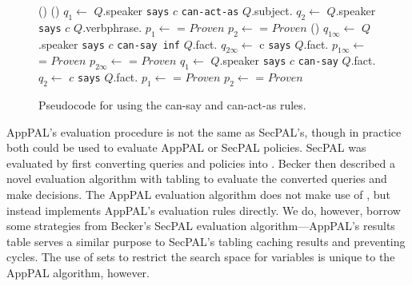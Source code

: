 \documentclass[thesis.tex]{subfiles}
\begin{document}
\begin{figure}\footnotesize\sffamily\centering
  \begin{algorithm}[H]
    \Fn(){}{
    }
   \; 
    \Fn(){}{
      $q_1 \gets$ $Q$.speaker \texttt{says} $c$ \texttt{can-act-as} $Q$.subject.\; 
      $q_2 \gets$ $Q$.speaker \texttt{says} $c$ $Q$.verbphrase.\;
      $p_1 \gets$  = $Proven$\;
      $p_2 \gets$  = $Proven$\;
    }
   \; 
    \Fn(){}{
      $q_{1\infty} \gets$ $Q$.speaker \texttt{says} $c$ \texttt{can-say inf} $Q$.fact.\; 
      $q_{2\infty} \gets$ c \texttt{says} $Q$.fact.\;
      $p_{1\infty} \gets$  = $Proven$\;
      $p_{2\infty} \gets$  = $Proven$\;
      $q_1 \gets$ $Q$.speaker \texttt{says} $c$ \texttt{can-say} $Q$.fact.\; 
      $q_2 \gets$ $c$ \texttt{says} $Q$.fact.\;
      $p_1 \gets$  = $Proven$\;
      $p_2 \gets$  = $Proven$\;
    }
  \end{algorithm}
  \caption{Pseudocode for using the can-say and can-act-as rules.}
  \label{alg:eval2}
\end{figure}

AppPAL's evaluation procedure is not the same as SecPAL's, though in practice
both could be used to evaluate AppPAL or SecPAL policies.  SecPAL was evaluated
by first converting queries and policies into \datalogc{}.  Becker then
described a novel \datalogc{} evaluation algorithm with tabling to evaluate the
converted queries and make decisions. The AppPAL evaluation algorithm does not
make use of  \datalogc{}, but instead implements AppPAL's
evaluation rules directly.  We do, however, borrow some strategies from
Becker's SecPAL evaluation algorithm---AppPAL's results table serves a similar
purpose to SecPAL's tabling caching results and preventing cycles.  The use of
sets to restrict the search space for variables is unique to the AppPAL
algorithm, however. 
\end{document}
